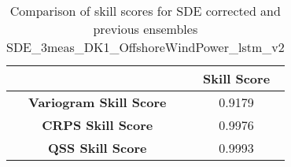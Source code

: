 
        \begin{table}[h!]
            \centering
            \begin{tabular}{|c|c|}
                \hline
                & \textbf{Skill Score}  \\
                \hline
                \textbf{Variogram Skill Score} & 0.9179  \\
                \hline
                \textbf{CRPS Skill Score} & 0.9976  \\
                \hline
                \textbf{QSS Skill Score} & 0.9993 \\
                \hline
            \end{tabular}
            \caption{Comparison of skill scores for SDE corrected and previous ensembles SDE_3meas_DK1_OffshoreWindPower_lstm_v2}
            \label{table:skill_scores_comparison}
        \end{table}
        